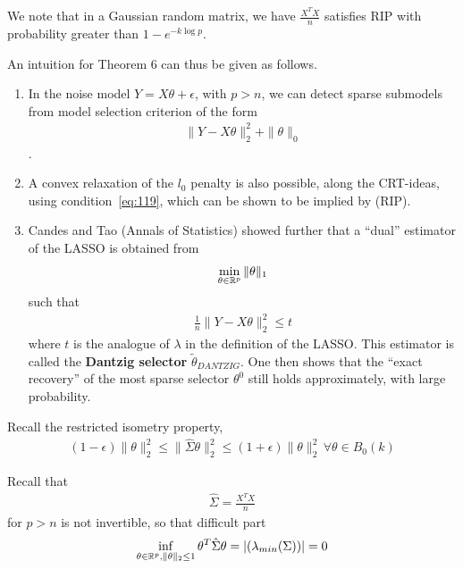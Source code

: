 We note that in a Gaussian random matrix, we have $\frac{X^{T} X}{n}$
satisfies RIP with probability greater than $1 - e^{-k \log p}$.

\begin{remark}
  An intuition for Theorem 6 can thus be given as follows.
  \begin{enumerate}
  \item In the noise model $Y = X \theta + \epsilon$, with $p > n$, we
    can detect sparse submodels from model selection criterion of the
    form
    \begin{align}
      \label{eq:145}
      \| Y - X \theta \|_{2}^{2} + \| \theta \|_{0}
    \end{align} .
  \item A convex relaxation of the $l_{0}$ penalty is also possible,
    along the CRT-ideas, using condition~\eqref{eq:119}, which can be
    shown to be implied by (RIP).
  \item Candes and Tao (Annals of Statistics) showed further that a
    ``dual'' estimator of the LASSO is obtained from
    \begin{align}
      \label{eq:146}
      \min_{\theta \in \mathbb{R}^{p}} \| \theta \|_{1}
    \end{align} such that
    \begin{align}
      \label{eq:147}
      \frac{1}{n} \| Y - X \theta \|_{2}^{2} \leq t
    \end{align} where $t$ is the analogue of $\lambda$ in the
    definition of the LASSO.  This estimator is called the
    \textbf{Dantzig selector} $\tilde \theta_{DANTZIG}$.  One then
    shows that the ``exact recovery'' of the most sparse selector
    $\theta^{0}$ still holds approximately, with large probability.
  \end{enumerate}
\end{remark}


Recall the restricted isometry property,
\begin{align}
  \label{eq:150}
  (1-\epsilon) \| \theta \|_{2}^{2} \leq \| \hat \Sigma \theta
  \|_{2}^{2} \leq (1+\epsilon) \| \theta \|_{2}^{2} \, \forall \theta
  \in B_{0}(k)
\end{align}

Recall that
\begin{align}
  \label{eq:144}
  \hat \Sigma = \frac{X^{T} X}{n}
\end{align} for $p > n$ is not invertible, so that difficult part
\begin{align}
  \label{eq:148}
  \inf_{\theta \in \mathbb{R}^{p}, \| \theta \|_{2} \leq 1} \theta^{T} \hat
  \Sigma \theta = |(\lambda_{min}(\Sigma))| = 0
\end{align}


